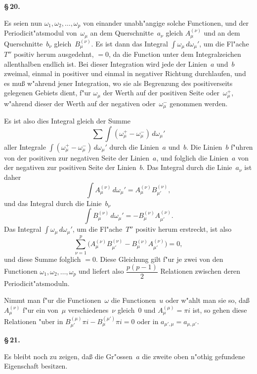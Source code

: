 \documentclass[12pt,a4paper]{article}
\begin{document}
\medskip
\textbf{\S\,20.}

Es seien nun $\omega_1, \omega_2, \ldots, \omega_p$ von einander unabh"angige solche
Functionen, und der Periodicit"atsmodul von~$\omega_\mu$ an dem Querschnitte~$a_\nu$
gleich $A_\mu^{(\nu)}$ und an dem Querschnitte~$b_\nu$ gleich~$B_\mu^{(\nu)}$.
Es ist dann das Integral $\int \omega_\mu\, d\omega_\mu'$, um die Fl"ache~$T''$
positiv herum ausgedehnt, $= 0$, da die Function unter dem Integralzeichen
allenthalben endlich ist. Bei dieser Integration wird jede der Linien~$a$
und~$b$ zweimal, einmal in positiver und einmal in negativer Richtung
durchlaufen, und es mu\ss{} w"ahrend jener Integration, wo sie als Begrenzung
des positiverseits gelegenen Gebiets dient, f"ur $\omega_\mu$ der Werth auf der
positiven Seite oder~$\omega_\mu^+$, w"ahrend dieser der Werth auf der negativen
oder~$\omega_\mu^-$ genommen werden.

Es ist also dies Integral gleich der Summe
\[
\sum \int (\omega_\mu^+ - \omega_\mu^-)\, d\omega_\mu'
\]
aller Integrale $\int (\omega_\mu^+ - \omega_\mu^-)\, d\omega_\mu'$ durch die Linien~$a$
und~$b$. Die Linien~$b$ f"uhren von der positiven zur negativen Seite
der Linien~$a$, und folglich die Linien~$a$ von der negativen zur positiven
Seite der Linien~$b$. Das Integral durch die Linie~$a_\nu$ ist daher
\[
\int A_\mu^{(\nu)}\, d\omega_\mu' = A_\mu^{(\nu)} B_{\mu'}^{(\nu)},
\]
und das Integral durch die Linie~$b_\nu$
\[
\int B_\mu^{(\nu)}\, d\omega_\mu' = -B_\mu^{(\nu)} A_{\mu'}^{(\nu)}.
\]
Das Integral $\int \omega_\mu\, d\omega_\mu'$, um die Fl"ache~$T''$ positiv herum
erstreckt, ist also
\[
\sum_{\nu=1}^{p} \bigl(A_\mu^{(\nu)} B_{\mu'}^{(\nu)}
  - B_\mu^{(\nu)} A_{\mu'}^{(\nu)}\bigr) = 0,
\]
und diese Summe folglich $= 0$. Diese Gleichung gilt f"ur je zwei von
den Functionen $\omega_1, \omega_2, \ldots, \omega_p$ und liefert also
$\dfrac{p(p-1)}{2}$ Relationen zwischen deren Periodicit"atsmoduln.

Nimmt man f"ur die Functionen~$\omega$ die Functionen~$u$ oder w"ahlt
man sie so, da\ss{} $A_\mu^{(\nu)}$ f"ur ein von~$\mu$ verschiedenes~$\nu$ gleich~$0$ und
$A_\mu^{(\mu)} = \pi i$ ist, so gehen diese Relationen "uber in
$B_{\mu'}^{(\mu)} \pi i - B_\mu^{(\mu')} \pi i = 0$ oder in $a_{\mu',\mu} = a_{\mu,\mu'}$.

\medskip
\textbf{\S\,21.}

Es bleibt noch zu zeigen, da\ss{} die Gr"ossen~$a$ die zweite oben
n"othig gefundene Eigenschaft besitzen.
\end{document}
